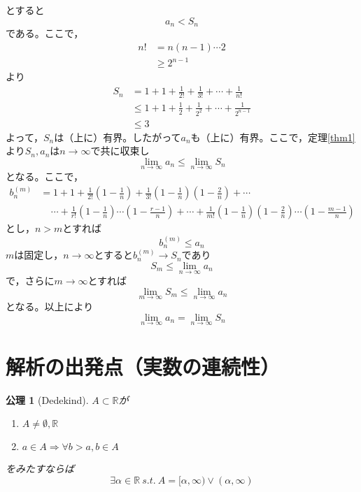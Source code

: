 \documentclass[dvipdfmx,a4j,10pt]{jsarticle}
\makeatletter
\theoremstyle{mystyle1}
\newtheorem{axi}[dfn]{公理}
\theoremstyle{mystyle2}
\newtheorem{ans}{解答}
\renewenvironment{ans}[1][解答]{\par
  \pushQED{\qed}%
  \normalfont
  \topsep6\p@\@plus6\p@ \trivlist
  \item[\hskip\labelsep{\bfseries\sffamily #1}]\ignorespaces
}{%
  \popQED\endtrivlist\@endpefalse
}
\makeatother
\begin{document}
\begin{ans}[解\ref{ex2}]
\begin{enumerate}
        	とすると
        	\[a_n<S_n\]
        	である。ここで，
        	\[
        	\begin{split}
        	n!&=n(n-1)\cdots2\\
        	&\geq2^{n-1}
        	\end{split}
        	\]
        	より
        	\[
        	\begin{split}
        	S_n&=1+1+\frac{1}{2!}+\frac{1}{3!}+\cdots+\frac{1}{n!}\\
        	&\leq 1+1+\frac{1}{2}+\frac{1}{2^2}+\cdots+\frac{1}{2^{n-1}}\\
        	&\leq 3
        	\end{split}
        	\]
        	よって，$S_n$は（上に）有界。したがって$a_n$も（上に）有界。ここで，定理\ref{thm1}より$S_n,a_n$は$n\to\infty$で共に収束し
        	\[\lim_{n\to\infty}a_n\leq\lim_{n\to\infty}S_n\]
        	となる。ここで，
        	\[
        	\begin{split}
        	b_n^{(m)}&=1+1+\frac{1}{2!}\left(1-\frac{1}{n}\right)+\frac{1}{3!}\left(1-\frac{1}{n}\right)\left(1-\frac{2}{n}\right)+\cdots\\
        	&\ \ \ \ \ \cdots+\frac{1}{r!}\left(1-\frac{1}{n}\right)\cdots\left(1-\frac{r-1}{n}\right)+\cdots+\frac{1}{m!}\left(1-\frac{1}{n}\right)\left(1-\frac{2}{n}\right)\cdots\left(1-\frac{m-1}{n}\right)
        	\end{split}
        	\]
        	とし，$n>m$とすれば
        	\[b_n^{(m)}\leq a_n\]
        	$m$は固定し，$n\to\infty$とすると$b_n^{(m)}\to S_n$であり
        	\[S_m\leq\lim_{n\to\infty}a_n\]
        	で，さらに$m\to\infty$とすれば
        	\[\lim_{m\to\infty}S_m\leq\lim_{n\to\infty}a_n\]
        	となる。以上により
        	\[\lim_{n\to\infty}a_n=\lim_{n\to\infty}S_n\]
    \end{enumerate}
\end{ans}

\newpage
\section{解析の出発点（実数の連続性）}
\begin{framed}
\begin{axi}[Dedekind]\label{axi1}
$A\subset\mathbb{R}$が
\begin{enumerate}
	\item $A\neq\emptyset,\mathbb{R}$
	\item $a\in A\Longrightarrow\forall b>a,b\in A$
\end{enumerate}
をみたすならば
\[\exists\alpha\in\mathbb{R}\ s.t.\ A=[\alpha,\infty)\lor(\alpha,\infty)\]
\end{axi}
\end{framed}
\end{document}
